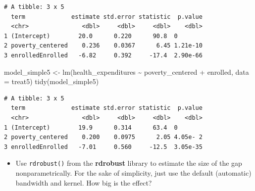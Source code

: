 \documentclass[
  letterpaper,
  DIV=11,
  numbers=noendperiod]{scrartcl}
\newenvironment{Shaded}{\begin{snugshade}}{\end{snugshade}}
\newcommand{\AttributeTok}[1]{\textcolor[rgb]{0.40,0.45,0.13}{#1}}
\newcommand{\DecValTok}[1]{\textcolor[rgb]{0.68,0.00,0.00}{#1}}
\newcommand{\FunctionTok}[1]{\textcolor[rgb]{0.28,0.35,0.67}{#1}}
\newcommand{\NormalTok}[1]{\textcolor[rgb]{0.00,0.23,0.31}{#1}}
\newcommand{\OtherTok}[1]{\textcolor[rgb]{0.00,0.23,0.31}{#1}}
\newcommand{\SpecialCharTok}[1]{\textcolor[rgb]{0.37,0.37,0.37}{#1}}
\providecommand{\tightlist}{%
  \setlength{\itemsep}{0pt}\setlength{\parskip}{0pt}}\usepackage{longtable,booktabs,array}
\begin{document}
\begin{verbatim}
# A tibble: 3 x 5
  term             estimate std.error statistic  p.value
  <chr>               <dbl>     <dbl>     <dbl>    <dbl>
1 (Intercept)        20.0      0.220      90.8  0       
2 poverty_centered    0.236    0.0367      6.45 1.21e-10
3 enrolledEnrolled   -6.82     0.392     -17.4  2.90e-66
\end{verbatim}

\begin{Shaded}
\begin{Highlighting}[numbers=left,,]
\NormalTok{model\_simple5 }\OtherTok{\textless{}{-}} \FunctionTok{lm}\NormalTok{(health\_expenditures }\SpecialCharTok{\textasciitilde{}}\NormalTok{ poverty\_centered }\SpecialCharTok{+}\NormalTok{ enrolled,}
                   \AttributeTok{data =}\NormalTok{ treat5)}
\FunctionTok{tidy}\NormalTok{(model\_simple5)}
\end{Highlighting}
\end{Shaded}

\begin{verbatim}
# A tibble: 3 x 5
  term             estimate std.error statistic  p.value
  <chr>               <dbl>     <dbl>     <dbl>    <dbl>
1 (Intercept)        19.9      0.314      63.4  0       
2 poverty_centered    0.200    0.0975      2.05 4.05e- 2
3 enrolledEnrolled   -7.01     0.560     -12.5  3.05e-35
\end{verbatim}

\begin{itemize}
\tightlist
\item
  Use \texttt{rdrobust()} from the \textbf{rdrobust} library to estimate
  the size of the gap nonparametrically. For the sake of simplicity,
  just use the default (automatic) bandwidth and kernel. How big is the
  effect?
\end{itemize}

\begin{Shaded}
\end{Shaded}
\end{document}
